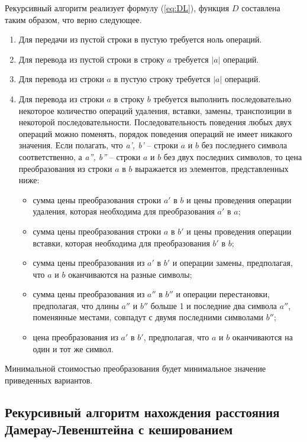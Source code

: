 Рекурсивный алгоритм реализует формулу (\ref{eq:DL}), функция $D$ составлена таким образом, что верно следующее.%
\begin{enumerate}
	\item Для передачи из пустой строки в пустую требуется ноль операций.
	\item Для перевода из пустой строки в строку $a$ требуется $|a|$ операций.
	\item Для перевода из строки $a$ в пустую строку требуется $|a|$ операций.
	\item Для перевода из строки $a$ в строку $b$ требуется выполнить последовательно некоторое количество операций удаления, вставки, замены, транспозиции в некоторой последовательности. Последовательность поведения любых двух операций можно поменять, порядок поведения операций не имеет никакого значения.
	Если полагать, что \textit{a', b'} -- строки $a$ и $b$ без последнего символа соответственно, а \textit{a'', b''} -- строки $a$ и $b$ без двух последних символов, то цена преобразования из строки $a$ в $b$ выражается из элементов, представленных ниже:
	\begin{itemize}[label=---]
		\item сумма цены преобразования строки $a'$ в $b$ и цены проведения операции удаления, которая необходима для преобразования $a'$ в $a$;
		\item сумма цены преобразования строки $a$ в $b'$  и цены проведения операции вставки, которая необходима для преобразования $b'$ в $b$;
		\item сумма цены преобразования из $a'$ в $b'$ и операции замены, предполагая, что $a$ и $b$ оканчиваются на разные символы;
		\item сумма цены преобразования из $a''$ в $b''$ и операции перестановки, предполагая, что длины $a''$ и $b''$ больше 1 и последние два символа $a''$, поменянные местами, совпадут с двумя последними символами $b''$;
		\item цена преобразования из $a'$ в $b'$, предполагая, что $a$ и $b$ оканчиваются на один и тот же символ.
	\end{itemize}
\end{enumerate}

Минимальной стоимостью преобразования будет минимальное значение приведенных вариантов.

\subsection{Рекурсивный алгоритм нахождения расстояния Дамерау-Левенштейна с кешированием}

